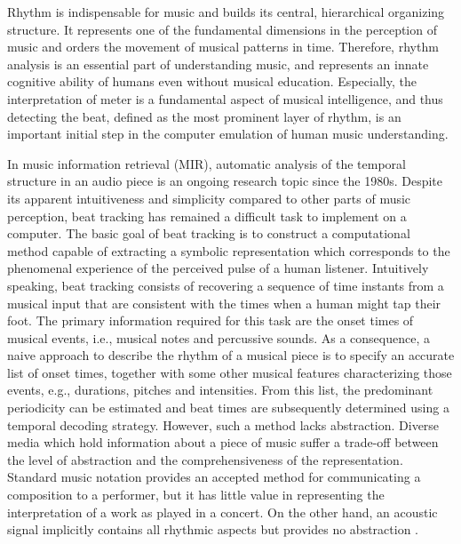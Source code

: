 \documentclass{scrartcl}
\begin{document}
Rhythm is indispensable for music and builds its central, hierarchical organizing structure. It represents one of the fundamental dimensions in the perception of music and orders the movement of musical patterns in time. Therefore, rhythm analysis is an essential part of understanding music, and represents an innate cognitive ability of humans even without musical education. Especially, the interpretation of meter is a fundamental aspect of musical intelligence, and thus detecting the beat, defined as the most prominent layer of rhythm, is an important initial step in the computer emulation of human music understanding. 

In music information retrieval (MIR), automatic analysis of the temporal structure in an audio piece is an ongoing research topic since the 1980s. Despite its apparent intuitiveness and simplicity compared to other parts of music perception, beat tracking has remained a difficult task to implement on a computer. The basic goal of beat tracking is to construct a computational method capable of extracting a symbolic representation which corresponds to the phenomenal experience of the perceived pulse of a human listener. Intuitively speaking, beat tracking consists of recovering a sequence of time instants from a musical input that are consistent with the times when a human might tap their foot. The primary information required for this task are the onset times of musical events, i.e., musical notes and percussive sounds. As a consequence, a naive approach to describe the rhythm of a musical piece is to specify an accurate list of onset times, together with some other musical features characterizing those events, e.g., durations, pitches and intensities. From this list, the predominant periodicity can be estimated and beat times are subsequently determined using a temporal decoding strategy. However, such a method lacks abstraction. Diverse media which hold information about a piece of music suffer a trade-off between the level of abstraction and the comprehensiveness of the representation. Standard music notation provides an accepted method for communicating a composition to a performer, but it has little value in representing the interpretation of a work as played in a concert. On the other hand, an acoustic signal implicitly contains all rhythmic aspects but provides no abstraction \cite{Gouyon2005}.

\end{document}
